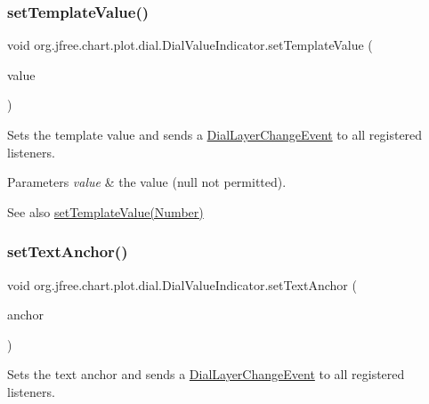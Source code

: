 \subsubsection{\texorpdfstring{set\+Template\+Value()}{setTemplateValue()}}
{\footnotesize\ttfamily void org.\+jfree.\+chart.\+plot.\+dial.\+Dial\+Value\+Indicator.\+set\+Template\+Value (\begin{DoxyParamCaption}\item[{Number}]{value }\end{DoxyParamCaption})}

Sets the template value and sends a \mbox{\hyperlink{classorg_1_1jfree_1_1chart_1_1plot_1_1dial_1_1_dial_layer_change_event}{Dial\+Layer\+Change\+Event}} to all registered listeners.


\begin{DoxyParams}{Parameters}
{\em value} & the value ({\ttfamily null} not permitted).\\
\hline
\end{DoxyParams}
\begin{DoxySeeAlso}{See also}
\mbox{\hyperlink{classorg_1_1jfree_1_1chart_1_1plot_1_1dial_1_1_dial_value_indicator_a9b3ddc35fb5d1372514575daeac445ed}{set\+Template\+Value(\+Number)}} 
\end{DoxySeeAlso}
\mbox{\label{classorg_1_1jfree_1_1chart_1_1plot_1_1dial_1_1_dial_value_indicator_a11234b9c4cad620ba9edee6123e21611}} 
\subsubsection{\texorpdfstring{set\+Text\+Anchor()}{setTextAnchor()}}
{\footnotesize\ttfamily void org.\+jfree.\+chart.\+plot.\+dial.\+Dial\+Value\+Indicator.\+set\+Text\+Anchor (\begin{DoxyParamCaption}\item[{Text\+Anchor}]{anchor }\end{DoxyParamCaption})}

Sets the text anchor and sends a \mbox{\hyperlink{classorg_1_1jfree_1_1chart_1_1plot_1_1dial_1_1_dial_layer_change_event}{Dial\+Layer\+Change\+Event}} to all registered listeners.


